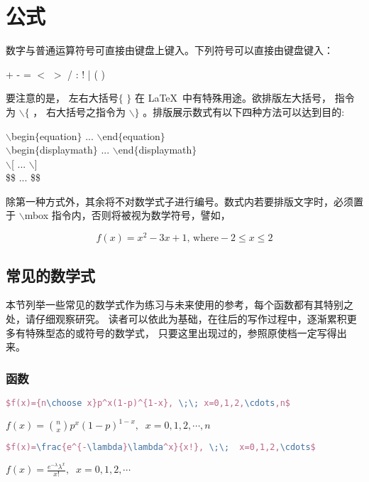 
\chapter{公式}
\song\wuhao
数字与普通运算符号可直接由键盘上键入。下列符号可以直接由键盘键入：

        \begin{center}
                    + \;-\; =\; $<$\; $>$ \;/ \;:\; !\; | \;[\; ] \;(\; )\\
        \end{center}
		
要注意的是， 左右大括号$\{$ $\}$ 在 \LaTeX\ 中有特殊用途。欲排版左大括号， 指令为 $\backslash \{$ ，
右大括号之指令为 $\backslash \}$ 。排版展示数式有以下四种方法可以达到目的:
        \begin{center}
$\backslash$begin$\{$equation$\}$ ... $\backslash$end$\{$equation$\}$\\
$\backslash$begin$\{$displaymath$\}$ ... $\backslash$end$\{$displaymath$\}$\\
$\backslash$[ ... $\backslash$]\\
\$\$ ... \$\$
        \end{center}
除第一种方式外，其余将不对数学式子进行编号。数式内若要排版文字时，必须置于
$\backslash$mbox 指令内，否则将被视为数学符号，譬如，

$$f(x)=x^2-3x+1 \mbox{, where} -2 \leq x \leq 2$$
\section{常见的数学式}
本节列举一些常见的数学式作为练习与未来使用的参考，每个函数都有其特别之处，请仔细观察研究。
读者可以依此为基础，在往后的写作过程中，逐渐累积更多有特殊型态的或符号的数学式，
只要这里出现过的，参照原使档一定写得出来。

\subsection{函数}
    \begin{lstlisting}[language=TeX,numbers=none,frame=lrtb,keywords={begin},label=Binomial,caption=Binomial] 
  $f(x)={n\choose x}p^x(1-p)^{1-x}, \;\; x=0,1,2,\cdots,n$ 
  \end{lstlisting}
  $f(x)={n\choose x}p^x(1-p)^{1-x}, \;\; x=0,1,2,\cdots,n$ 
   
  \begin{lstlisting}[language=TeX,numbers=none,frame=lrtb,keywords={begin},label=Poisson,caption=Poisson] 
  $f(x)=\frac{e^{-\lambda}\lambda^x}{x!}, \;\;  x=0,1,2,\cdots$ 
  \end{lstlisting}
  $f(x)=\frac{e^{-\lambda}\lambda^x}{x!}, \;\;  x=0,1,2,\cdots$
  
